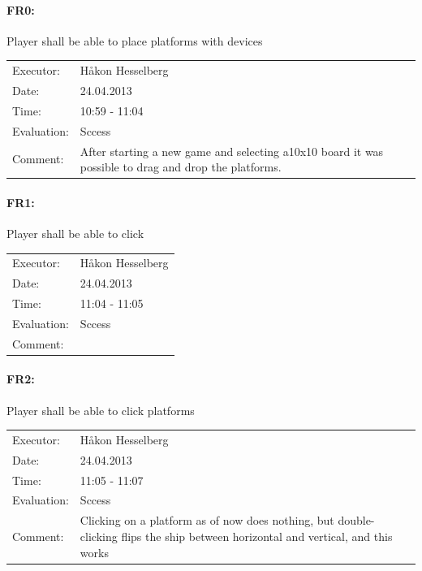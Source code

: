 \documentclass[12pt, a4paper]{article}
\begin{document}
\paragraph{FR0:} Player shall be able to place platforms with devices\\
\begin{tabular}{  p{}  p{} }
	Executor: & Håkon Hesselberg  \\
	Date: & 24.04.2013 \\
	Time: & 10:59 - 11:04  \\
	Evaluation: & Sccess \\
	Comment: & After starting a new game and selecting a10x10 board it was
possible to drag and drop the platforms. \\
\end{tabular}

\paragraph{FR1:} Player shall be able to click \\
\begin{tabular}{  p{}  p{} }
    Executor: & Håkon Hesselberg  \\
    Date: & 24.04.2013 \\
    Time: & 11:04 - 11:05  \\
    Evaluation: & Sccess \\
    Comment: & \\
\end{tabular}

\paragraph{FR2:} Player shall be able to click platforms\\
\begin{tabular}{  p{}  p{} }
    Executor: & Håkon Hesselberg  \\
    Date: & 24.04.2013 \\
    Time: & 11:05 - 11:07  \\
    Evaluation: & Sccess \\
    Comment: & Clicking on a platform as of now does nothing, but
double-clicking flips the ship between horizontal and vertical, and this works \\ 
\end{tabular}
\end{document}
